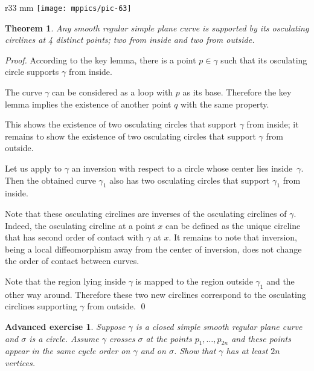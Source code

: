 \documentclass{article}
\theoremstyle{theorem}
\newtheorem{theorem}{Theorem}
\newtheorem*{advancedexercise}{Advanced exercise}
\theoremstyle{definition}
\begin{document}
{

\begin{wrapfigure}{r}{33 mm}
\vskip-4mm
\centering
\texttt{[image: mppics/pic-63]}
\vskip0mm
\end{wrapfigure}

\begin{theorem}\label{thm:4-vert}
Any smooth regular simple plane curve is supported by its osculating circlines at 4 distinct points; two from inside and two from outside.
\end{theorem}

\medskip\noindent\textit{Proof.}
According to the key lemma, there is a point $p\in\gamma$ such that its osculating circle supports $\gamma$ from inside.

The curve $\gamma$ can be considered as a loop with $p$ as its base.
Therefore the key lemma implies the existence of another point $q$ with the same property.


This shows the existence of two osculating circles that support $\gamma$ from inside;
it remains to show the existence of two osculating circles that support $\gamma$ from outside.

Let us apply to $\gamma$ an inversion with respect to a circle whose center lies inside~$\gamma$.
Then the obtained curve $\gamma_1$ also has  two osculating circles that support $\gamma_1$ from inside.

}

Note that these osculating circlines are inverses of the osculating circlines of $\gamma$.
Indeed, the osculating circline at a point $x$ can be defined as the unique circline that has second order of contact with $\gamma$ at $x$.
It remains to note that inversion, being a local diffeomorphism away from the center of inversion, does not change the order of contact between curves.

Note that the region lying inside $\gamma$ is mapped to the region outside $\gamma_1$ and the other way around.
Therefore these two new circlines correspond to the osculating circlines supporting $\gamma$ from outside.
\qed

\begin{advancedexercise}\label{ex:curve-crosses-circle}
Suppose $\gamma$ is a closed simple smooth regular plane curve and $\sigma$ is a circle.
Assume $\gamma$ crosses $\sigma$ at the points $p_1,\dots,p_{2 n}$ and these points appear in the same cycle order on $\gamma$ and on $\sigma$.
Show that $\gamma$ has at least $2 n$ vertices.
\end{advancedexercise}
\end{document}
